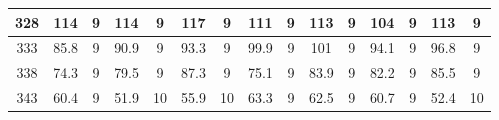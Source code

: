 \begin{table}[H]
{\begin{tabular}{|c|cccccccccccccc|}
328                                   & \multicolumn{1}{c|}{114}     & \multicolumn{1}{c|}{9}                                  & \multicolumn{1}{c|}{114}       & \multicolumn{1}{c|}{9}                                  & \multicolumn{1}{c|}{117}       & \multicolumn{1}{c|}{9}                                  & \multicolumn{1}{c|}{111}       & \multicolumn{1}{c|}{9}                                  & \multicolumn{1}{c|}{113}       & \multicolumn{1}{c|}{9}                                  & \multicolumn{1}{c|}{104}       & \multicolumn{1}{c|}{9}                                  & \multicolumn{1}{c|}{113}       & 9                                  \\ \hline
333                                   & \multicolumn{1}{c|}{85.8}    & \multicolumn{1}{c|}{9}                                  & \multicolumn{1}{c|}{90.9}      & \multicolumn{1}{c|}{9}                                  & \multicolumn{1}{c|}{93.3}      & \multicolumn{1}{c|}{9}                                  & \multicolumn{1}{c|}{99.9}      & \multicolumn{1}{c|}{9}                                  & \multicolumn{1}{c|}{101}       & \multicolumn{1}{c|}{9}                                  & \multicolumn{1}{c|}{94.1}      & \multicolumn{1}{c|}{9}                                  & \multicolumn{1}{c|}{96.8}      & 9                                  \\ \hline
338                                   & \multicolumn{1}{c|}{74.3}    & \multicolumn{1}{c|}{9}                                  & \multicolumn{1}{c|}{79.5}      & \multicolumn{1}{c|}{9}                                  & \multicolumn{1}{c|}{87.3}      & \multicolumn{1}{c|}{9}                                  & \multicolumn{1}{c|}{75.1}      & \multicolumn{1}{c|}{9}                                  & \multicolumn{1}{c|}{83.9}      & \multicolumn{1}{c|}{9}                                  & \multicolumn{1}{c|}{82.2}      & \multicolumn{1}{c|}{9}                                  & \multicolumn{1}{c|}{85.5}      & 9                                  \\ \hline
343                                   & \multicolumn{1}{c|}{60.4}    & \multicolumn{1}{c|}{9}                                  & \multicolumn{1}{c|}{51.9}      & \multicolumn{1}{c|}{10}                                 & \multicolumn{1}{c|}{55.9}      & \multicolumn{1}{c|}{10}                                 & \multicolumn{1}{c|}{63.3}      & \multicolumn{1}{c|}{9}                                  & \multicolumn{1}{c|}{62.5}      & \multicolumn{1}{c|}{9}                                  & \multicolumn{1}{c|}{60.7}      & \multicolumn{1}{c|}{9}                                  & \multicolumn{1}{c|}{52.4}      & 10                                 \\ \hline
\end{tabular}}
\end{table}

